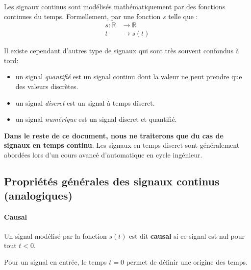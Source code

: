 Les signaux continus sont modélisés mathématiquement par des fonctions 
continues du temps. Formellement, par une fonction $s$ telle que :
\begin{align*}
s : \mathbb{R}&\rightarrow\mathbb{R} \\  
t&\rightarrow s(t) 
\end{align*}    

Il existe cependant d'autres type de signaux qui sont très souvent confondus 
à tord:
\begin{itemize}
    \item un signal \emph{quantifié} est un signal continu 
          dont la valeur ne peut prendre que des valeurs discrètes. 
    \item un signal \emph{discret} est un signal à temps discret.
    \item un signal \emph{numérique} est un signal discret et quantifié.   
\end{itemize}

\textbf{Dans le reste de ce document, nous ne traiterons que
du cas de signaux en temps continu}. Les signaux en temps discret
sont généralement abordées lors d'un cours 
avancé d'automatique en cycle ingénieur.

\subsection{Propriétés générales des signaux continus (analogiques)}

\paragraph{Causal}

Un signal modélisé par la fonction $s(t)$ est dit \textbf{causal}
si ce signal est nul pour tout $t<0$. 
\begin{figure}[htb]
\centering
{}

\end{figure}
\setlength\intextsep{0pt}
Pour un signal en entrée, le temps $t=0$ permet de 
définir une origine des temps.

